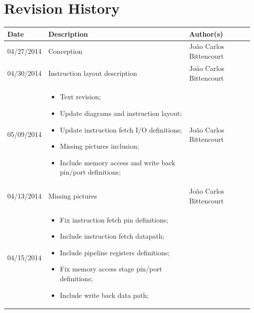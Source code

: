 \documentclass{article}
\begin{document}
  \section*{\center Revision History}
  \vspace*{1cm}
  \begin{center} %
    \begin{longtable}[pos]{|m{2cm} | m{7.2cm} | m{3.8cm}|} 
      \hline %
      \cellcolor[gray]{0.9}
      \textbf{Date} & \cellcolor[gray]{0.9}\textbf{Description} & \cellcolor[gray]{0.9}\textbf{Author(s)}\\ \hline
      \hline
      \small 04/27/2014 & \small Conception & \small João Carlos Bittencourt \\ \hline
      \small 04/30/2014 & \small Instruction layout description & \small João Carlos Bittencourt \\ \hline
      \small 05/09/2014 & 
      \begin{small}
        \begin{itemize}
          \item Text revision;
          \item Update diagrams and instruction layout;
          \item Update instruction fetch I/O definitions;
          \item Missing pictures inclusion;
          \item Include memory access and write back pin/port definitions;
        \end{itemize}
      \end{small} & \small João Carlos Bittencourt \\ \hline
      \small 04/13/2014 & \small Missing pictures & \small João Carlos Bittencourt \\ \hline
      \small 04/15/2014 & \small   \begin{small}
        \begin{itemize}
          \item Fix instruction fetch pin definitions;
          \item Include instruction fetch datapath;
          \item Include pipeline registers definitions;
          \item Fix memory access stage pin/port definitions;
          \item Include write back data path;
        \end{itemize}

\end{small}
\end{longtable}
\end{center}
\end{document}
